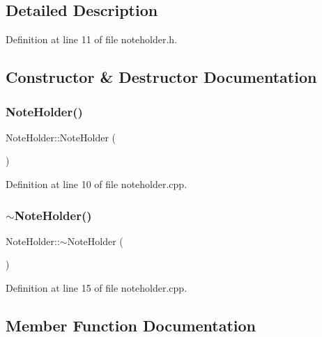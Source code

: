 \subsection{Detailed Description}


Definition at line 11 of file noteholder.\+h.



\subsection{Constructor \& Destructor Documentation}
\hypertarget{classNoteHolder_a8a6d0e272ccfe8f56534c646b8c5e92c}{}\label{classNoteHolder_a8a6d0e272ccfe8f56534c646b8c5e92c} 
\subsubsection{\texorpdfstring{Note\+Holder()}{NoteHolder()}}
{\footnotesize\ttfamily Note\+Holder\+::\+Note\+Holder (\begin{DoxyParamCaption}{ }\end{DoxyParamCaption})}



Definition at line 10 of file noteholder.\+cpp.

\hypertarget{classNoteHolder_afaeb3c127fbbc30d03b69e2cb0f15f2a}{}\label{classNoteHolder_afaeb3c127fbbc30d03b69e2cb0f15f2a} 
\subsubsection{\texorpdfstring{$\sim$\+Note\+Holder()}{~NoteHolder()}}
{\footnotesize\ttfamily Note\+Holder\+::$\sim$\+Note\+Holder (\begin{DoxyParamCaption}{ }\end{DoxyParamCaption})}



Definition at line 15 of file noteholder.\+cpp.



\subsection{Member Function Documentation}
\hypertarget{classNoteHolder_a4559ef4141f902ae5712052084c6187e}{}\label{classNoteHolder_a4559ef4141f902ae5712052084c6187e} 
